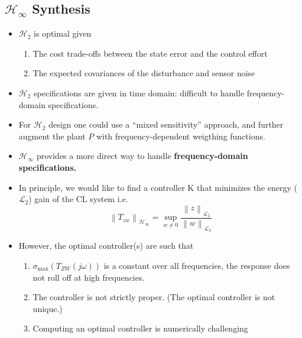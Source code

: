 \subsection{\texorpdfstring{$\mathcal{H}_\infty$}{H-infinity} Synthesis}
\begin{itemize}
    \item $\mathcal{H}_2$ is optimal given
          \begin{enumerate}
              \item The cost trade-offs between the state error and the control effort
              \item The expected covariances of the disturbance and sensor noise
          \end{enumerate}
    \item $\mathcal{H}_2$ specifications are given in time domain: difficult to handle frequency-domain specifications.
    \item For $\mathcal{H}_2$ design one could use a “mixed sensitivity” approach, and further augment the plant $P$ with frequency-dependent weigthing functions.
    \item $\mathcal{H}_\infty$ provides a more direct way to handle \textbf{frequency-domain specifications.}
\end{itemize}

\begin{itemize}
    \item In principle, we would like to find a controller K that minimizes the energy ($\mathcal{L}_2$) gain of the CL system i.e.
          \begin{equation*}
              \left\|T_{zw}\right\|_{\mathcal{H}_\infty}=\sup_{w\neq0}\frac{\left\|z\right\|_{\mathcal{L}_2}}{\left\|w\right\|_{\mathcal{L}_2}}
          \end{equation*}
    \item However, the optimal controller(s) are such that
          \begin{enumerate}
              \item $\sigma_{\max}(T_{ZW}(j\omega))$ is a constant over all frequencies, the response does not roll off at high frequencies.
              \item The controller is not strictly proper. (The optimal controller is not unique.)
              \item Computing an optimal controller is numerically challenging
          \end{enumerate}
\end{itemize}

